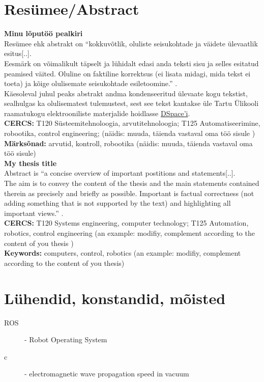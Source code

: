 \documentclass[12pt]{report}
\begin{document}
\chapter*{Res\"umee/Abstract}
\textbf{Minu l\~oput\"o\"o pealkiri}
\\[5mm]
Res\"umee ehk abstrakt on ``kokkuv\~otlik, oluliste seisukohtade ja v\"aidete \"ulevaatlik esitus[..].
\\[5mm]
Eesm\"ark on v\~oimalikult t\"apselt ja l\"uhidalt edasi anda teksti sisu ja selles esitatud peamised v\"aited. Oluline on faktiline korrektsus (ei lisata midagi, mida tekst ei toeta) ja k\~oige olulisemate seisukohtade esiletoomine.'' \cite{bib:wiki-abstract}.
\\[5mm]
K\"aesoleval juhul peaks abstrakt andma kondenseeritud \"ulevaate kogu tekstist, sealhulgas ka olulisematest tulemustest, sest see tekst kantakse \"ule Tartu \"Ulikooli raamatukogu elektrooniliste materjalide hoidlasse \href{http://dspace.utlib.ee/dspace/}{DSpace'i}.
\\[5mm]
\textbf{CERCS:} T120 S\"usteemitehnoloogia, arvutitehnoloogia; T125 Automatiseerimine, robootika, control engineering; (n\"aidis: muuda, t\"aienda vastaval oma t\"o\"o sisule \cite{cercs})
\\[5mm]
\textbf{M\"arks\~onad:} arvutid, kontroll, robootika (n\"aidis: muuda, t\"aienda vastaval oma t\"o\"o sisule)
\\[10mm]
\textbf{My thesis title}
\\[5mm]
Abstract is ``a concise overview of important postitions and statements[..].
\\[5mm]
The aim is to convey the content of the thesis and the main statements contained therein as precisely and briefly as possible. Important is factual correctness (not adding something that is not supported by the text) and highlighting all important views.'' \cite{bib:wiki-abstract}. 
\\[5mm]
\textbf{CERCS:} T120 Systems engineering, computer technology; T125 Automation, robotics, control engineering (an example: modifiy, complement according to the content of you thesis \cite{cercs})
\\[5mm]
\textbf{Keywords:} computers, control, robotics (an example: modifiy, complement according to the content of you thesis)
\tableofcontents
\listoffigures
\listoftables
\chapter*{L\"uhendid, konstandid, m\~oisted}
\begin{description}
\item[ROS] - Robot Operating System
\item[c] - electromagnetic wave propagation speed in vacuum
\end{description}
\end{document}
